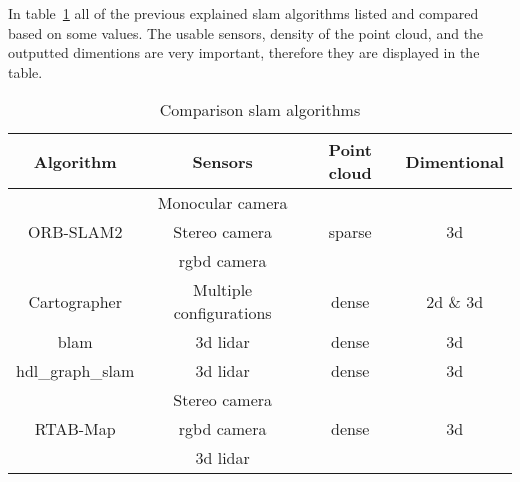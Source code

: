 In table~\ref{tab:slam_comparison} all of the previous explained \acs{slam} algorithms listed and compared based on some values. The usable sensors, density of the point cloud, and the outputted dimentions are very important, therefore they are displayed in the table.

\begin{table}[!h]
  \centering
  \begin{tabular}{| c | c | c | c |}
    \hline
    \textbf{Algorithm} & \textbf{Sensors} & \textbf{Point cloud} & \textbf{Dimentional}\\
    \hline
    \multirow{3}{*}{ORB\hyp{}SLAM2} & Monocular camera & \multirow{3}{*}{sparse} & \multirow{3}{*}{\acs{3d}}\\
    & Stereo camera & &\\
    & \acs{rgbd} camera & &\\
    \hline
    Cartographer & Multiple configurations & dense & \acs{2d} \& \acs{3d}\\
    \hline
    \acs{blam} & \acs{3d} \acs{lidar} & dense & \acs{3d}\\
    \hline
    hdl\_graph\_slam & \acs{3d} \acs{lidar} & dense & \acs{3d}\\
    \hline
    \multirow{3}{*}{RTAB-Map} & Stereo camera & \multirow{3}{*}{dense} & \multirow{3}{*}{\acs{3d}}\\
    & \acs{rgbd} camera & &\\
    & \acs{3d} \acs{lidar} & &\\
    \hline
  \end{tabular}
  \caption{Comparison \acs{slam} algorithms}
  \label{tab:slam_comparison}
\end{table}